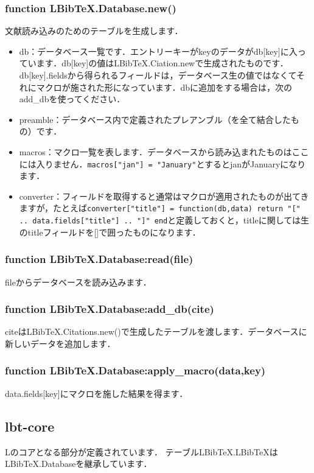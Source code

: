 \documentclass[dvipdfmx,a4paper]{jsarticle}
\DeclareRobustCommand{\LBibTeX}{L\BibTeX}
\begin{document}
\subsubsection{function LBibTeX.Database.new()}
文献読み込みのためのテーブルを生成します．
\begin{itemize}
\item db：データベース一覧です．エントリーキーがkeyのデータがdb[key]に入っています．db[key]の値はLBibTeX.Ciation.newで生成されたものです．db[key].fieldsから得られるフィールドは，データベース生の値ではなくてそれにマクロが施された形になっています．dbに追加をする場合は，次のadd\_dbを使ってください．
\item preamble：データベース内で定義されたプレアンブル（を全て結合したもの）です．
\item macros：マクロ一覧を表します．データベースから読み込まれたものはここには入りません．\verb|macros["jan"] = "January"|とするとjanがJanuaryになります．
\item converter：フィールドを取得すると通常はマクロが適用されたものが出てきますが，たとえば\verb|converter["title"] = function(db,data) return "[" .. data.fields["title"] .. "]" end|と定義しておくと，titleに関しては生のtitleフィールドを[]で囲ったものになります．
\end{itemize}

\subsubsection{function LBibTeX.Database:read(file)}
fileからデータベースを読み込みます．

\subsubsection{function LBibTeX.Database:add\_db(cite)}
citeはLBibTeX.Citations.new()で生成したテーブルを渡します．データベースに新しいデータを追加します．

\subsubsection{function LBibTeX.Database:apply\_macro(data,key)}
data.fields[key]にマクロを施した結果を得ます．

\subsection{lbt-core}\label{subsec:lbt-core}
\LBibTeX のコアとなる部分が定義されています．
テーブルLBibTeX.LBibTeXはLBibTeX.Databaseを継承しています．
\end{document}
